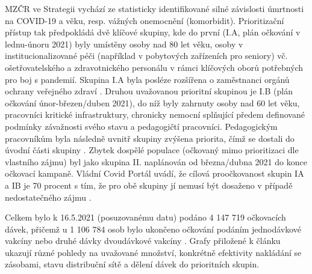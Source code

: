 MZČR ve Strategii vychází ze statisticky identifikované silné závislosti úmrtnosti na COVID-19 a věku, resp. vážných onemocnění (komorbidit). Prioritizační přístup tak předpokládá dvě klíčové skupiny, kde do první (I.A, plán očkování v lednu-únoru 2021) byly umístěny osoby nad 80 let věku, osoby v institucionalizované péči (například v pobytových zařízeních pro seniory) vč. ošetřovatelského a zdravotnického personálu v rámci klíčových oborů potřebných pro boj s pandemií. Skupina I.A byla posléze rozšířena o zaměstnanci orgánů ochrany veřejného zdraví \cite{prioritizace_hygiena}. 
%
Druhou uvažovanou prioritní skupinou je I.B (plán očkování únor-březen/duben 2021), do níž byly zahrnuty osoby nad 60 let věku, pracovníci kritické infrastruktury, chronicky nemocní splňující předem definované podmínky závažnosti svého stavu a pedagogičtí pracovníci. %
Pedagogickým pracovníkům byla následně uvnitř skupiny zvýšena priorita, čímž se dostali do úvodní části skupiny \cite{prioritizace_ockovani}. Zbytek dospělé populace (očkovaný mimo prioritizaci dle vlastního zájmu) byl jako skupina II. naplánován od března/dubna 2021 do konce očkovací kampaně. Vládní Covid Portál uvádí, že cílová proočkovanost skupin IA a IB je 70 procent s tím, že pro obě skupiny jí nemusí být dosaženo v případě nedostatečného zájmu \cite{kdoprvni}.

Celkem bylo k 16.5.2021 (posuzovanému datu) podáno 4 147 719 očkovacích dávek, přičemž u 1 106 784 osob bylo ukončeno očkování podáním jednodávkové vakcíny nebo druhé dávky dvoudávkové vakcíny \cite{mzcr_data}. Grafy přiložené k článku ukazují různé pohledy na uvažované množství, konkrétně efektivity nakládání se zásobami, stavu distribuční sítě a dělení dávek do prioritních skupin.



